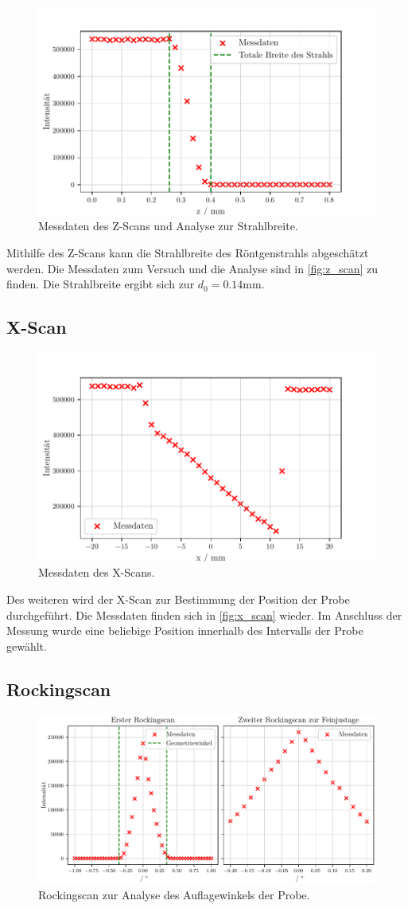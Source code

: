 \begin{figure}
    \centering
    \includegraphics[width = 0.5 \linewidth]{build/z_scan.pdf}
    \caption{Messdaten des Z-Scans und Analyse zur Strahlbreite.}
    \label{fig:z_scan}
\end{figure}

Mithilfe des Z-Scans kann die Strahlbreite des Röntgenstrahls abgeschätzt werden.
Die Messdaten zum Versuch und die Analyse sind in \autoref{fig:z_scan} zu finden.
Die Strahlbreite ergibt sich zur $d_0 = 0.14 \unit{\milli\meter}$.

\subsection{X-Scan}

\begin{figure}
    \centering
    \includegraphics[width = 0.5 \linewidth]{build/x_scan.pdf}
    \caption{Messdaten des X-Scans.}
    \label{fig:x_scan}
\end{figure}

Des weiteren wird der X-Scan zur Bestimmung der Position der Probe durchgeführt.
Die Messdaten finden sich in \autoref{fig:x_scan} wieder.
Im Anschluss der Messung wurde eine beliebige Position innerhalb des Intervalls der Probe gewählt.

\subsection{Rockingscan}

\begin{figure}
    \centering
    \includegraphics[width = 0.5 \linewidth]{build/rockingscan.pdf}
    \caption{Rockingscan zur Analyse des Auflagewinkels der Probe.}
    \label{fig:rockingscan}
\end{figure}

